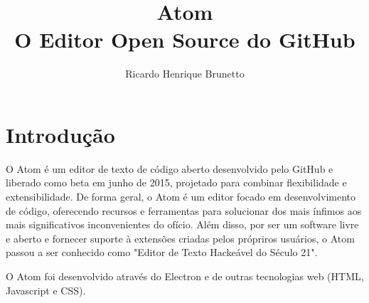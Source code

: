 

\sloppy

\title{Atom\\O Editor Open Source do GitHub}

\author{Ricardo Henrique Brunetto}


\address{Departamento de Informática -- Universidade Estadual de Maringá (UEM)\\
	Maringá -- PR -- Brasil
}



	\maketitle

	{}

  \section{Introdução}
	O Atom é um editor de texto de código aberto desenvolvido pelo GitHub e liberado como beta em junho de 2015, projetado para combinar flexibilidade e extensibilidade. De forma geral, o Atom é um editor focado em desenvolvimento de código, oferecendo recursos e ferramentas para solucionar dos mais ínfimos aos mais significativos inconvenientes do ofício. Além disso, por ser um software livre e aberto e fornecer suporte à extensões criadas pelos própriros usuários, o Atom passou a ser conhecido como "Editor de Texto Hackeável do Século 21".

	O Atom foi desenvolvido através do Electron e de outras tecnologias web (HTML, Javascript e CSS).

	
	



